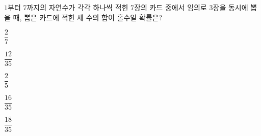 $1$부터 $7$까지의 자연수가 각각 하나씩 적힌 $7$장의 카드 중에서 임의로 $3$장을 동시에 뽑을 때, 뽑은 카드에 적힌 세 수의 합이 홀수일 확률은?
\begin{choices32}{\rule[-3ex]{0pt}{8ex}$\dfrac{2}{7}$}{\rule[-3ex]{0pt}{8ex}$\dfrac{12}{35}$}{\rule[-3ex]{0pt}{8ex}$\dfrac{2}{5}$}{\rule[-3ex]{0pt}{8ex}$\dfrac{16}{35}$}{\rule[-3ex]{0pt}{8ex}$\dfrac{18}{35}$}\end{choices32}
